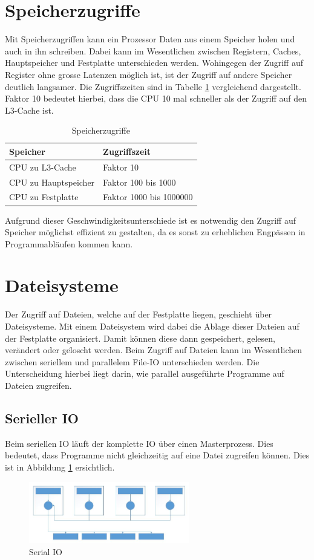 \section{Speicherzugriffe}
Mit Speicherzugriffen kann ein Prozessor Daten aus einem Speicher holen und auch in ihn schreiben. Dabei kann im Wesentlichen zwischen Registern, Caches, Hauptspeicher und Festplatte unterschieden werden. Wohingegen der Zugriff auf Register ohne grosse Latenzen m\"oglich ist, ist der Zugriff auf andere Speicher deutlich langsamer. Die Zugriffszeiten sind in Tabelle \ref{tab:Speicher} vergleichend dargestellt. Faktor 10 bedeutet hierbei, dass die CPU 10 mal schneller als der Zugriff auf den L3-Cache ist. 
\begin{table}[h]
	\centering
	\begin{tabular}{l|l}
		\textbf{Speicher} & \textbf{Zugriffszeit} \\
		\hline
		CPU zu L3-Cache & Faktor 10 \\
		\hline
		CPU zu Hauptspeicher & Faktor 100 bis 1000 \\
		\hline
		CPU zu Festplatte & Faktor 1000 bis 1000000 \\
	\end{tabular}
	\caption{Speicherzugriffe}
	\label{tab:Speicher}
\end{table}

Aufgrund dieser Geschwindigkeitsunterschiede ist es notwendig den Zugriff auf Speicher m\"oglichst effizient zu gestalten, da es sonst zu erheblichen Engp\"assen in Programmabl\"aufen kommen kann.

\section{Dateisysteme}
Der Zugriff auf Dateien, welche auf der Festplatte liegen, geschieht \"uber Dateisysteme. Mit einem Dateisystem wird dabei die Ablage dieser Dateien auf der Festplatte organisiert. Damit k\"onnen diese dann gespeichert, gelesen, ver\"andert oder ge\"loscht werden.
Beim Zugriff auf Dateien kann im Wesentlichen zwischen seriellem und parallelem File-IO unterschieden werden. Die Unterscheidung hierbei liegt darin, wie parallel ausgef\"uhrte Programme auf Dateien zugreifen.
\subsection{Serieller IO}
Beim seriellen IO l\"auft der komplette IO \"uber einen Masterprozess. Dies bedeutet, dass Programme nicht gleichzeitig auf eine Datei zugreifen k\"onnen. Dies ist in Abbildung \ref{fig:serial} ersichtlich.
\begin{figure}[h]
	\centering
	\includegraphics[width=7cm]{fig/SerialIO.JPG}
	\caption{Serial IO \cite{Cazes.26.09.2013}}
	\label{fig:serial}
\end{figure}

